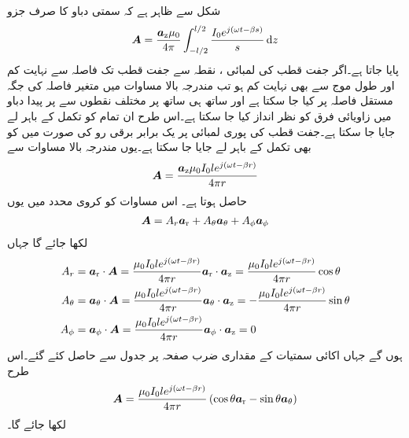 شکل سے ظاہر ہے کہ سمتی دباو کا صرف  جزو
\begin{align}\label{مساوات_اینٹینا_جفت_قطب_سمتی_دباو_حصول}
\kvec{A}=\frac{\az \mu_0 }{4\pi} \int_{-l/2}^{l/2} \frac{I_0 e^{j(\omega t -\beta s)}}{s} \dif z
\end{align}
 پایا جاتا ہے۔اگر جفت قطب کی لمبائی ، نقطہ  سے جفت قطب تک فاصلہ  سے نہایت کم  اور طول موج  سے بھی نہایت کم  ہو تب مندرجہ بالا مساوات میں متغیر فاصلہ  کی جگہ مستقل فاصلہ  پر کیا جا سکتا ہے اور ساتھ ہی ساتھ  پر مختلف نقطوں سے   پر پیدا دباو میں زاویائی فرق کو نظر انداز کیا جا سکتا ہے۔اس طرح ان تمام کو تکمل کے باہر لے جایا جا سکتا ہے۔جفت قطب کی پوری لمبائی پر یک برابر برقی رو  کی صورت میں  کو بھی تکمل کے باہر لے جایا جا سکتا ہے۔یوں مندرجہ بالا مساوات سے
\begin{align}\label{مساوات_اینٹینا_جفت_قطب_سمتی_دباو_حاصل}
{\ensuremath{{\boldsymbol{A}}}} =\frac{{\boldsymbol{a}}_{\textup{z}} \mu_0 I_0 l e^{j(\omega t -\beta r)}}{4\pi r}
\end{align}
حاصل ہوتا ہے۔ اس مساوات کو کروی محدد میں یوں
\begin{align*}
{\ensuremath{{\boldsymbol{A}}}}=A_r {\boldsymbol{a}}_{\textup{r}} +A_{\theta} {\boldsymbol{a}}_{\theta} +A_{\phi} {\boldsymbol{a}}_{\phi}
\end{align*}
لکھا جائے گا جہاں
\begin{gather}
\begin{aligned}\label{مساوات_اینٹینا_کروی_سمتی_دباو}
A_r&={\boldsymbol{a}}_{\textup{r}} \cdot {\ensuremath{{\boldsymbol{A}}}}= \frac{ \mu_0 I_0 l e^{j(\omega t -\beta r)}}{4\pi r} {\boldsymbol{a}}_{\textup{r}} \cdot {\boldsymbol{a}}_{\textup{z}}= \frac{ \mu_0 I_0 l e^{j(\omega t -\beta r)}}{4\pi r} \cos \theta\\
A_{\theta}&={\boldsymbol{a}}_{\theta} \cdot {\ensuremath{{\boldsymbol{A}}}}=\frac{ \mu_0 I_0 l e^{j(\omega t -\beta r)}}{4\pi r} {\boldsymbol{a}}_{\theta} \cdot {\boldsymbol{a}}_{\textup{z}} =-\frac{ \mu_0 I_0 l e^{j(\omega t -\beta r)}}{4\pi r} \sin \theta \\
A_{\phi}&={\boldsymbol{a}}_{\phi} \cdot {\ensuremath{{\boldsymbol{A}}}}=\frac{ \mu_0 I_0 l e^{j(\omega t -\beta r)}}{4\pi r} {\boldsymbol{a}}_{\phi} \cdot {\boldsymbol{a}}_{\textup{z}} =0
\end{aligned}
\end{gather}
ہوں گے جہاں اکائی سمتیات کے مقداری ضرب صفحہ  پر جدول  سے حاصل کئے گئے۔اس طرح 
\begin{align}\label{مساوات_اینٹینا_جفت_قطب_سمتی_دباو}
{\ensuremath{{\boldsymbol{A}}}}=\frac{ \mu_0 I_0 l e^{j(\omega t -\beta r)}}{4\pi r}\left(\cos \theta {\boldsymbol{a}}_{\textup{r}}-\sin \theta {\boldsymbol{a}}_{\theta} \right)
\end{align}
لکھا جائے گا۔

